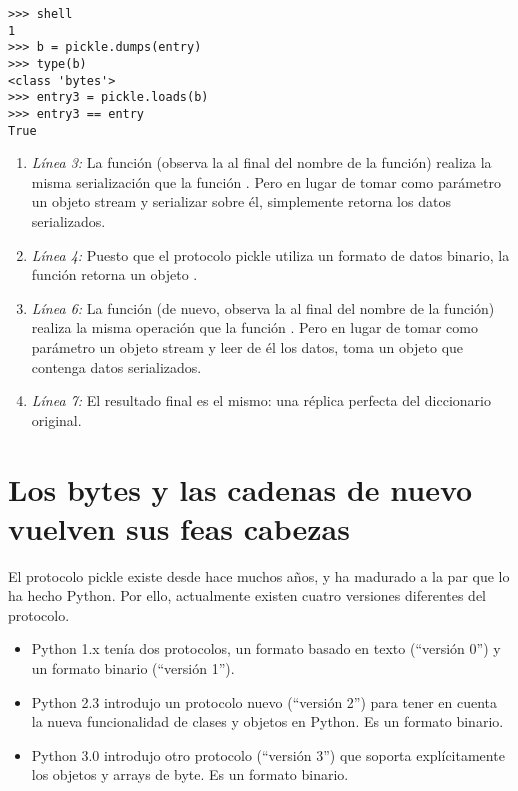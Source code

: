 \noindent\begin{minipage}{\textwidth}
\begin{lstlisting}[mathescape=True]
>>> shell
1
>>> b = pickle.dumps(entry)
>>> type(b)               
<class 'bytes'>
>>> entry3 = pickle.loads(b)
>>> entry3 == entry        
True
\end{lstlisting}
\end{minipage}

\begin{enumerate}

\item \emph{Línea 3:} La función  (observa la  al final del nombre de la función) realiza la misma serialización que la función . Pero en lugar de tomar como parámetro un objeto stream y serializar sobre él, simplemente retorna los datos serializados.

\item \emph{Línea 4:} Puesto que el protocolo pickle utiliza un formato de datos binario, la función  retorna un objeto .

\item \emph{Línea 6:} La función  (de nuevo, observa la  al final del nombre de la función) realiza la misma operación que la función . Pero en lugar de tomar como parámetro un objeto stream y leer de él los datos, toma un objeto  que contenga datos serializados.

\item \emph{Línea 7:} El resultado final es el mismo: una réplica perfecta del diccionario original.

\end{enumerate}


\section{Los bytes y las cadenas de nuevo vuelven sus feas cabezas}

El protocolo pickle existe desde hace muchos años, y ha madurado a la par que lo ha hecho Python. Por ello, actualmente existen cuatro versiones diferentes del protocolo.

\begin{itemize}

\item Python 1.x tenía dos protocolos, un formato basado en texto (``versión 0'') y un formato binario (``versión 1'').

\item Python 2.3 introdujo un protocolo nuevo (``versión 2'') para tener en cuenta la nueva funcionalidad de clases y objetos en Python. Es un formato binario.

\item Python 3.0 introdujo otro protocolo (``versión 3'') que soporta explícitamente los objetos  y arrays de byte. Es un formato binario.

\end{itemize}

